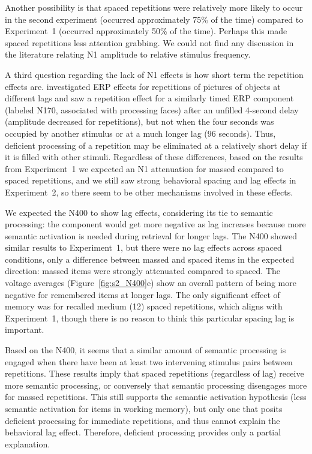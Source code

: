 Another possibility is that spaced repetitions were relatively more likely to occur in the second experiment (occurred approximately 75\% of the time) compared to Experiment~1 (occurred approximately 50\% of the time).  Perhaps this made spaced repetitions less attention grabbing.  We could not find any discussion in the literature relating N1 amplitude to relative stimulus frequency.


A third question regarding the lack of N1 effects is how short term the repetition effects are.   investigated ERP effects for repetitions of pictures of objects at different lags and saw a repetition effect for a similarly timed ERP component (labeled N170, associated with processing faces) after an unfilled 4-second delay (amplitude decreased for repetitions), but not when the four seconds was occupied by another stimulus or at a much longer lag (96 seconds).  Thus, deficient processing of a repetition may be eliminated at a relatively short delay if it is filled with other stimuli.  Regardless of these differences, based on the results from Experiment~1 we expected an N1 attenuation for massed compared to spaced repetitions, and we still saw strong behavioral spacing and lag effects in Experiment~2, so there seem to be other mechanisms involved in these effects.


We expected the N400 to show lag effects, considering its tie to semantic processing: the component would get more negative as lag increases because more semantic activation is needed during retrieval for longer lags.  The N400 showed similar results to Experiment~1, but there were no lag effects across spaced conditions, only a difference between massed and spaced items in the expected direction: massed items were strongly attenuated compared to spaced.  The voltage averages (Figure~\ref{fig:s2_N400}e) show an overall pattern of being more negative for remembered items at longer lags.  The only significant effect of memory was for recalled medium (12) spaced repetitions, which aligns with Experiment~1, though there is no reason to think this particular spacing lag is important.

Based on the N400, it seems that a similar amount of semantic processing is engaged when there have been at least two intervening stimulus pairs between repetitions.
These results imply that spaced repetitions (regardless of lag) receive more semantic processing, or conversely that semantic processing disengages more for massed repetitions.  This still supports the  semantic activation hypothesis (less semantic activation for items in working memory), but only one that posits deficient processing for immediate repetitions, and thus cannot explain the behavioral lag effect.
Therefore, deficient processing provides only a partial explanation.


